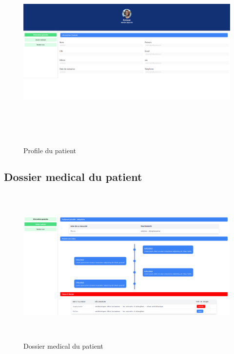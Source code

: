 \begin{figure}[!h]
\centering
\begin{center}
\includegraphics[height=10cm,width=18cm]{gen.png}
\end{center}
\caption{Profile du patient}
\end{figure}

\subsection{Dossier medical du patient}


\begin{figure}[!h]
\begin{center}
\includegraphics[height=8cm,width=18cm]{med.png}
\end{center}
\caption{Dossier medical du patient}
\end{figure}






